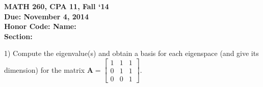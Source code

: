 \documentclass{article}
\begin{document}
\begin{flushleft}
	\bfseries{MATH 260, CPA 11, Fall `14}\\
	\bfseries{Due: November 4, 2014}\\
	\bfseries{Honor Code:} \hspace{3.5in}\bfseries{Name:}\\
	\hspace{4.37in}\bfseries{Section:}
\end{flushleft}
\vspace{.25in}
\begin{flushleft}

1) Compute the eigenvalue(s) and obtain a basis for each eigenspace (and give its dimension) for the matrix $\textbf{A} = \begin{bmatrix} 1&1&1 \\ 0&1&1\\ 0&0&1 \end{bmatrix}$.


\end{flushleft}
\end{document}
